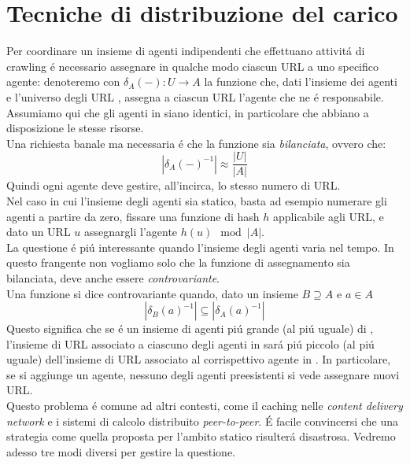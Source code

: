 \section{Tecniche di distribuzione del carico}
Per coordinare un insieme  di agenti indipendenti che effettuano attivitá di crawling é necessario assegnare in qualche modo ciascun URL a uno specifico agente: denoteremo con $\delta_A(-): U \rightarrow A$ la funzione che, dati l'insieme dei agenti  e l'universo degli URL , assegna a ciascun URL l'agente che ne é responsabile. Assumiamo qui che gli agenti in  siano identici, in particolare che abbiano a disposizione le stesse risorse.\\
Una richiesta banale ma necessaria é che la funzione sia \textit{bilanciata}, ovvero che:
\begin{equation*}
    |\delta_A(-)^{-1}| \approx \frac{|U|}{|A|}
\end{equation*}
Quindi ogni agente deve gestire, all'incirca, lo stesso numero di URL.\\
Nel caso in cui l'insieme degli agenti sia statico, basta ad esempio numerare gli agenti a partire da zero, fissare una funzione di hash $h$ applicabile agli URL, e dato un URL $u$ assegnargli l'agente $h(u)\mod|A|$.\\
La questione é piú interessante quando l'insieme degli agenti varia nel tempo. In questo frangente non vogliamo solo che la funzione di assegnamento sia bilanciata, deve anche essere \textit{controvariante}.\\
Una funzione si dice controvariante quando, dato un insieme $B \supseteq A$ e $a \in A$
\begin{equation*}
    |\delta_B(a)^{-1}| \subseteq |\delta_A(a)^{-1}|
\end{equation*}
Questo significa che se  é un insieme di agenti piú grande (al piú uguale) di , l'insieme di URL associato a ciascuno degli agenti in  sará piú piccolo (al piú uguale) dell'insieme di URL associato al corrispettivo agente in . In particolare, se si aggiunge un agente, nessuno degli agenti preesistenti si vede assegnare nuovi URL.\\
Questo problema é comune ad altri contesti, come il caching nelle \textit{content delivery network} e i sistemi di calcolo distribuito \textit{peer-to-peer}. É facile convincersi che una strategia come quella proposta per l'ambito statico risulterá disastrosa. Vedremo adesso tre modi diversi per gestire la questione.
